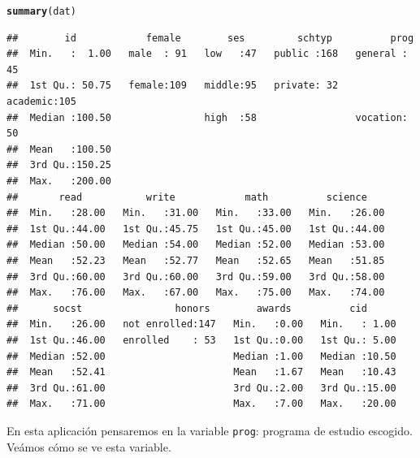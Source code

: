 \documentclass[onesided]{article}\usepackage[]{graphicx}\usepackage[]{color}
\makeatletter
\newcommand{\hlstd}[1]{\textcolor[rgb]{0.345,0.345,0.345}{#1}}%
\newcommand{\hlkwd}[1]{\textcolor[rgb]{0.737,0.353,0.396}{\textbf{#1}}}%
\newenvironment{kframe}{%
 \def\at@end@of@kframe{}%
 \ifinner\ifhmode%
  \def\at@end@of@kframe{\end{minipage}}%
  \begin{minipage}{\columnwidth}%
 \fi\fi%
 \def\FrameCommand##1{\hskip\@totalleftmargin \hskip-\fboxsep
 \colorbox{shadecolor}{##1}\hskip-\fboxsep
     \hskip-\linewidth \hskip-\@totalleftmargin \hskip\columnwidth}%
 \MakeFramed {\advance\hsize-\width
   \@totalleftmargin\z@ \linewidth\hsize
   \@setminipage}}%
 {\par\unskip\endMakeFramed%
 \at@end@of@kframe}
\newenvironment{knitrout}{}{} %
\makeatother
\begin{document}
\begin{knitrout}
\color{fgcolor}\begin{kframe}
\begin{alltt}
\hlkwd{summary}\hlstd{(dat)}
\end{alltt}
\begin{verbatim}
##        id            female        ses         schtyp          prog    
##  Min.   :  1.00   male  : 91   low   :47   public :168   general : 45  
##  1st Qu.: 50.75   female:109   middle:95   private: 32   academic:105  
##  Median :100.50                high  :58                 vocation: 50  
##  Mean   :100.50                                                        
##  3rd Qu.:150.25                                                        
##  Max.   :200.00                                                        
##       read           write            math          science     
##  Min.   :28.00   Min.   :31.00   Min.   :33.00   Min.   :26.00  
##  1st Qu.:44.00   1st Qu.:45.75   1st Qu.:45.00   1st Qu.:44.00  
##  Median :50.00   Median :54.00   Median :52.00   Median :53.00  
##  Mean   :52.23   Mean   :52.77   Mean   :52.65   Mean   :51.85  
##  3rd Qu.:60.00   3rd Qu.:60.00   3rd Qu.:59.00   3rd Qu.:58.00  
##  Max.   :76.00   Max.   :67.00   Max.   :75.00   Max.   :74.00  
##      socst                honors        awards          cid       
##  Min.   :26.00   not enrolled:147   Min.   :0.00   Min.   : 1.00  
##  1st Qu.:46.00   enrolled    : 53   1st Qu.:0.00   1st Qu.: 5.00  
##  Median :52.00                      Median :1.00   Median :10.50  
##  Mean   :52.41                      Mean   :1.67   Mean   :10.43  
##  3rd Qu.:61.00                      3rd Qu.:2.00   3rd Qu.:15.00  
##  Max.   :71.00                      Max.   :7.00   Max.   :20.00
\end{verbatim}
\end{kframe}
\end{knitrout}

En esta aplicaci\'on pensaremos en la variable \texttt{prog}: programa de estudio escogido. Ve\'amos c\'omo se ve esta variable.
\end{document}
